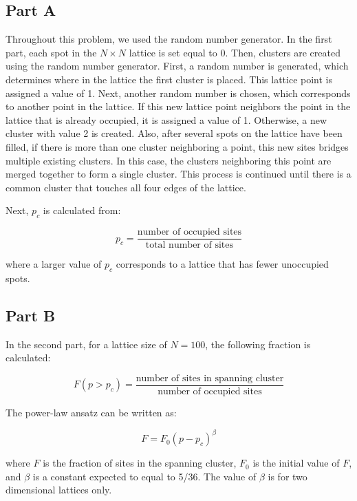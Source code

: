 \documentclass[12pt]{article}
\begin{document}
\subsection{Part A}
\indent \indent Throughout this problem, we used the random number generator.
 In the first part, each spot in the $N \times N$ lattice is set equal to 0. Then, clusters are created using the random number generator. First, a random number is generated, which determines where in the lattice the first cluster is placed. This lattice point is assigned a value of 1. Next, another random number is chosen, which corresponds to another point in the lattice. If this new lattice point neighbors the point in the lattice that is already occupied, it is assigned a value of 1. Otherwise, a new cluster with value 2 is created.  \newline
 \indent Also, after several spots on the lattice have been filled, if there is more than one cluster neighboring a point, this new sites bridges multiple existing clusters. In this case, the clusters neighboring this point are merged together to form a single cluster. This process is continued until there is a common cluster that touches all four edges of the lattice. \newline
 
\indent Next, $p_c$ is calculated from:

\begin{equation}
	p_c=\frac{\text{number of occupied sites}}{\text{total number of sites}}
\end{equation}

\indent where a larger value of $p_c$ corresponds to a lattice that has fewer unoccupied spots.

\subsection{Part B}
\indent \indent In the second part, for a lattice size of $N=100$, the following fraction is calculated:

\begin{equation}
F(p>p_c)=\frac{\text{number of sites in spanning cluster}}{\text{number of occupied sites}}
\end{equation}

\indent The power-law ansatz can be written as:

\begin{equation}
F=F_0(p-p_c)^\beta
\end{equation}

where $F$ is the fraction of sites in the spanning cluster, $F_0$ is the initial value of $F$, and $\beta$ is a constant expected to equal to 5/36. The value of $\beta$ is for two dimensional lattices only.\newline
\end{document}
